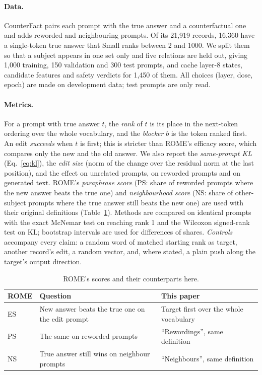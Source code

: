 \documentclass[11pt,twocolumn]{article}
\begin{document}
\paragraph{Data.} CounterFact \citep{meng2022} pairs each prompt with the true answer and a counterfactual one and adds reworded and neighbouring prompts. Of its 21,919 records, 16,360 have a single-token true answer that Small ranks between 2 and 1000. We split them so that a subject appears in one set only and five relations are held out, giving 1,000 training, 150 validation and 300 test prompts, and cache layer-8 states, candidate features and safety verdicts for 1,450 of them. All choices (layer, dose, epoch) are made on development data; test prompts are only read.

\paragraph{Metrics.} For a prompt with true answer $t$, the \emph{rank} of $t$ is its place in the next-token ordering over the whole vocabulary, and the \emph{blocker} $b$ is the token ranked first. An edit \emph{succeeds} when $t$ is first; this is stricter than ROME's efficacy score, which compares only the new and the old answer. We also report the \emph{same-prompt KL} (Eq.~\ref{eq:kl}), the \emph{edit size} (norm of the change over the residual norm at the last position), and the effect on unrelated prompts, on reworded prompts and on generated text. ROME's \emph{paraphrase score} (PS: share of reworded prompts where the new answer beats the true one) and \emph{neighbourhood score} (NS: share of other-subject prompts where the true answer still beats the new one) are used with their original definitions (Table~\ref{tab:metricmap}). Methods are compared on identical prompts with the exact McNemar test \citep{mcnemar1947} on reaching rank 1 and the Wilcoxon signed-rank test \citep{wilcoxon1945} on KL; bootstrap intervals \citep{efron1979} are used for differences of shares. \emph{Controls} accompany every claim: a random word of matched starting rank as target, another record's edit, a random vector, and, where stated, a plain push along the target's output direction.

\begin{table}[t]
\centering\small
\begin{tabular}{@{}p{}p{}p{}@{}}
\toprule
\textbf{ROME} & \textbf{Question} & \textbf{This paper}\\
\midrule
ES & New answer beats the true one on the edit prompt & Target first over the whole vocabulary\\
PS & The same on reworded prompts & ``Rewordings'', same definition\\
NS & True answer still wins on neighbour prompts & ``Neighbours'', same definition\\
\bottomrule
\end{tabular}
\caption{ROME's scores and their counterparts here.}
\label{tab:metricmap}
\end{table}
\end{document}
